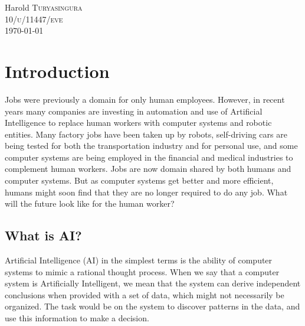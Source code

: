 \documentclass[12pt, a4paper]{report}
\begin{document}
\begin{titlepage}
\large
Harold \textsc{Turyasingura}\\
\textsc{10/u/11447/eve}\\[3cm] %


{\large \today} %
 

\vfill %

\end{titlepage}

\tableofcontents
\newpage

\sectionfont{\scshape}
\section*{Introduction}
Jobs were previously a domain for only human employees. However, in recent years many
companies are investing in automation and use of Artificial Intelligence to replace human
workers with computer systems and robotic entities. Many factory jobs have been taken up
by robots, self-driving cars are being tested for both the transportation industry and for
personal use, and some computer systems are being employed in the financial and medical
industries to complement human workers. Jobs are now domain shared by both humans and
computer systems. But as computer systems get better and more efficient, humans might soon
find that they are no longer required to do any job. What will the future look like for
the human worker?\\

\subsection*{What is AI?}
Artificial Intelligence (AI) in the simplest terms is the ability of computer systems to mimic a
rational thought process. When we say that a computer system is Artificially Intelligent,
we mean that the system can derive independent conclusions when provided with a set of
data, which might not necessarily be organized. The task would be on the system to discover
patterns in the data, and use this information to make a decision.\\
\end{document}
